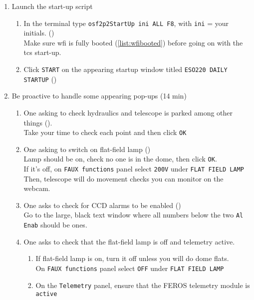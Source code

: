 \documentclass[11pt,fleqn,a4paper]{book}
\begin{document}
\begin{enumerate}
\begin{enumerate}
          \item Launch the start-up script
          \begin{enumerate}
             \item In the terminal type \texttt{\gls{osf2p2StartUp} ini ALL F8}, with \texttt{ini} = your initials.\label{list:tcsboot} ()\\
                   Make sure \gls{wfi} is fully booted (\ref{list:wfibooted}) before going on with the \gls{tcs} start-up.
              \item Click \texttt{START} on the appearing startup window titled \texttt{ESO220 DAILY STARTUP} ()
          \end{enumerate}
          \item Be proactive to handle some appearing pop-ups (14 min) 
          \begin{enumerate}
             \item One asking to check hydraulics and telescope is parked among other things ().\\
                   Take your time to check each point and then click \texttt{OK}          
             \item One asking to switch on flat-field lamp\label{list:tcsonline} ()\\
                   Lamp should be on, check no one is in the \gls{dome}, then click \texttt{OK}.\\
                   If it's off, on \texttt{FAUX functions} panel select \texttt{200V} under \texttt{FLAT FIELD LAMP}\\
                   Then, telescope will do movement checks you can monitor on the webcam.
             \item One asks to check for CCD alarms to be enabled ()\\
                   Go to the large, black text window where all numbers below the two \texttt{Al Enab} should be ones.
             \item One asks to check that the flat-field lamp is off and \gls{telemetry} active.
                \begin{enumerate}
                 \item If flat-field lamp is on, turn it off unless you will do \gls{dome flats}.\\
                   On \texttt{FAUX functions} panel select \texttt{OFF} under \texttt{FLAT FIELD LAMP}          
                 \item On the \texttt{Telemetry} panel, ensure that the FEROS \gls{telemetry} module is \texttt{active}\\

\end{enumerate}
\end{enumerate}
\end{enumerate}
\end{enumerate}
\end{document}
